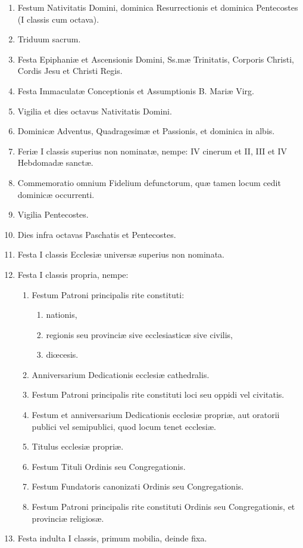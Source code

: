 \documentclass[vesperale_romanum.tex]{subfiles}
\begin{document}
 \begin{enumerate}[nosep]
\item
Festum Nativitatis Domini, dominica Resurrectionis et dominica Pentecostes (I classis cum octava).
\item Triduum sacrum.
\item Festa Epiphaniæ et Ascensionis Domini, Ss.mæ Trinitatis, Corporis Christi, Cordis Jesu et Christi Regis.
\item Festa Immaculatæ Conceptionis et Assumptionis B. Mariæ Virg.
\item Vigilia et dies octavus Nativitatis Domini.
\item
 Dominicæ Adventus, Quadragesimæ et Passionis, et dominica in albis.
\item
Feriæ I classis superius non nominatæ, nempe: IV cinerum et II, III et IV Hebdomadæ sanctæ.
\item
Commemoratio omnium Fidelium defunctorum, quæ tamen locum cedit dominicæ occurrenti.
\item
Vigilia Pentecostes.
\item
Dies infra octavas Paschatis et Pentecostes.
\item
Festa I classis Ecclesiæ universæ superius non nominata.
\item
Festa I classis propria, nempe:
\begin{enumerate}[nosep,label=\arabic*.]
\item
Festum Patroni principalis rite constituti:
\begin{enumerate}[nosep,label=\alph*.]
\item
nationis,
\item
 regionis seu provinciæ sive ecclesiasticæ sive civilis,
\item
diœcesis.
\end{enumerate}
\item
Anniversarium Dedicationis ecclesiæ cathedralis.
\item
Festum Patroni principalis rite constituti loci seu oppidi vel civitatis.
\item
Festum et anniversarium Dedicationis ecclesiæ propriæ, aut oratorii publici vel semipublici, quod locum tenet ecclesiæ.
\item
Titulus ecclesiæ propriæ.
\item
Festum Tituli Ordinis seu Congregationis.
\item
Festum Fundatoris canonizati Ordinis seu Congregationis.
\item
Festum Patroni principalis rite constituti Ordinis seu Congregationis, et provinciæ religiosæ.
\end{enumerate}
\item
Festa indulta I classis, primum mobilia, deinde fixa.
\end{enumerate}
\end{document}

